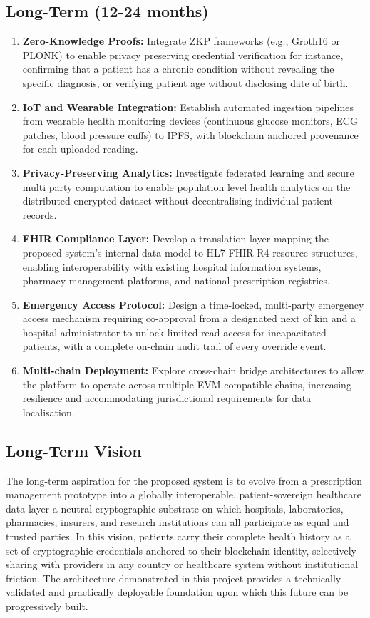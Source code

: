 \documentclass[12pt,a4wide]{report}
\begin{document}
\subsection{Long-Term (12-24 months)}

\begin{enumerate}
  \item \textbf{Zero-Knowledge Proofs:} Integrate ZKP frameworks (e.g., Groth16
    or PLONK) to enable privacy preserving credential verification for instance,
    confirming that a patient has a chronic condition without revealing the specific
    diagnosis, or verifying patient age without disclosing date of birth.
  \item \textbf{IoT and Wearable Integration:} Establish automated ingestion
    pipelines from wearable health monitoring devices (continuous glucose monitors,
    ECG patches, blood pressure cuffs) to IPFS, with blockchain anchored provenance
    for each uploaded reading.
  \item \textbf{Privacy-Preserving Analytics:} Investigate federated learning and
    secure multi party computation to enable population level health analytics on
    the distributed encrypted dataset without decentralising individual patient records.
  \item \textbf{FHIR Compliance Layer:} Develop a translation layer mapping
    the proposed system's internal data model to HL7 FHIR R4 resource structures, enabling
    interoperability with existing hospital information systems, pharmacy management
    platforms, and national prescription registries.
  \item \textbf{Emergency Access Protocol:} Design a time-locked, multi-party
    emergency access mechanism requiring co-approval from a designated next of kin
    and a hospital administrator to unlock limited read access for incapacitated
    patients, with a complete on-chain audit trail of every override event.
  \item \textbf{Multi-chain Deployment:} Explore cross-chain bridge architectures
    to allow the platform to operate across multiple EVM compatible chains,
    increasing resilience and accommodating jurisdictional requirements for data
    localisation.
\end{enumerate}

\subsection{Long-Term Vision}

The long-term aspiration for the proposed system is to evolve from a prescription management
prototype into a globally interoperable, patient-sovereign healthcare data layer a neutral cryptographic substrate on which hospitals, laboratories, pharmacies,
insurers, and research institutions can all participate as equal and trusted parties.
In this vision, patients carry their complete health history as a set of
cryptographic credentials anchored to their blockchain identity, selectively sharing
with providers in any country or healthcare system without institutional friction.
The architecture demonstrated in this project provides a technically validated and
practically deployable foundation upon which this future can be progressively built.
\end{document}

